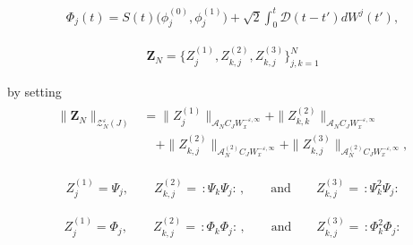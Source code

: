 \documentclass[10pt,a4paper]{amsart}
\newcommand{\A}{\mathcal{A}}
\newcommand{\D}{\mathcal{D}}
\newcommand{\ZZ}{\mathcal{Z}}
\newcommand{\eps}{\varepsilon}
\newcommand{\noi}{\noindent}
\newcommand{\wick}[1]{:\!{#1}\!:}
\begin{document}
\begin{align}
\Phi_j (t) = 
S(t) \big(\phi^{(0)}_j, \phi^{(1)}_j\big) + \sqrt {2} \int_0^t \D (t - t') d W^j (t'), 
\label{phi2}
\end{align}

\begin{align}
\pmb Z_N = \big\{Z_j^{(1)},  Z_{k, j}^{(2)}, Z_{k, j}^{(3)}\big\}_{j, k = 1}^N
\label{X0}
\end{align}

\noi
by setting
\begin{align}
\begin{split}
\| \pmb Z_N \|_{\ZZ_N^\eps(J)}
&
=  \|Z_j^{(1)}\|_{\A_N C_J W_x^{- \eps, \infty}}
+  \|Z_{k, k}^{(2)}\|_{\A_N C_J W_x^{- \eps, \infty}}\\
&  \quad
+  \|Z_{k, j}^{(2)}\|_{\A^{(2)}_N C_J W_x^{- \eps, \infty}}
 +   \|Z_{k, j}^{(3)}\|_{\A^{(2)}_N C_J W_x^{- \eps, \infty}}, 
\end{split}
\label{X1}
\end{align}

\begin{align}
Z_j^{(1)} = \Psi_j,\qquad   Z_{k, j}^{(2)} = \, \wick{\Psi_k \Psi_j} \, , 
\qquad \text{and}\qquad 
Z_{k, j}^{(3)}
=  \, \wick{\Psi_k^2 \Psi_j} 
\label{X2}
\end{align}

\begin{align}
Z_j^{(1)} = \Phi_j,\qquad   Z_{k, j}^{(2)} = \, \wick{\Phi_k \Phi_j} \,, 
\qquad \text{and}\qquad 
Z_{k, j}^{(3)}
=  \, \wick{\Phi_k^2 \Phi_j}
\label{X3}
\end{align}
\end{document}
